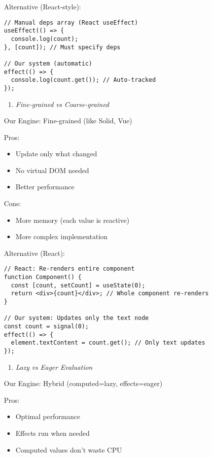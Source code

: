 \documentclass[11pt]{article}
\begin{document}
Alternative (React-style):
\begin{verbatim}
// Manual deps array (React useEffect)
useEffect(() => {
  console.log(count);
}, [count]); // Must specify deps

// Our system (automatic)
effect(() => {
  console.log(count.get()); // Auto-tracked
});
\end{verbatim}

\begin{enumerate}
\item \emph{Fine-grained vs Coarse-grained}
\end{enumerate}

Our Engine: Fine-grained (like Solid, Vue)

Pros:
\begin{itemize}
\item Update only what changed
\item No virtual DOM needed
\item Better performance
\end{itemize}

Cons:
\begin{itemize}
\item More memory (each value is reactive)
\item More complex implementation
\end{itemize}

Alternative (React):
\begin{verbatim}
// React: Re-renders entire component
function Component() {
  const [count, setCount] = useState(0);
  return <div>{count}</div>; // Whole component re-renders
}

// Our system: Updates only the text node
const count = signal(0);
effect(() => {
  element.textContent = count.get(); // Only text updates
});
\end{verbatim}

\begin{enumerate}
\item \emph{Lazy vs Eager Evaluation}
\end{enumerate}

Our Engine: Hybrid (computed=lazy, effects=eager)

Pros:
\begin{itemize}
\item Optimal performance
\item Effects run when needed
\item Computed values don't waste CPU
\end{itemize}
\end{document}
